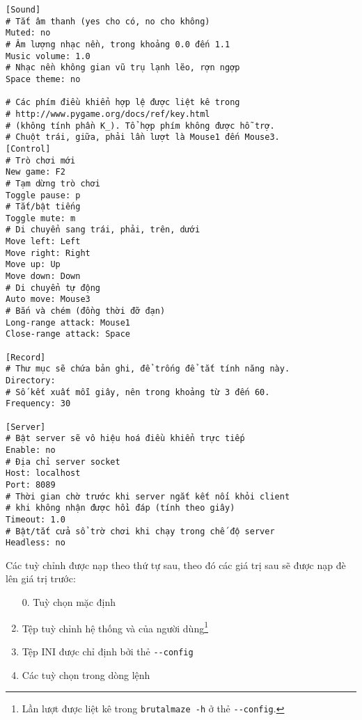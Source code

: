 \documentclass[a4paper,12pt]{article}
\begin{document}
\begin{verbatim}
[Sound]
# Tắt âm thanh (yes cho có, no cho không)
Muted: no
# Âm lượng nhạc nền, trong khoảng 0.0 đến 1.1
Music volume: 1.0
# Nhạc nền không gian vũ trụ lạnh lẽo, rợn ngợp
Space theme: no

# Các phím điều khiển hợp lệ được liệt kê trong
# http://www.pygame.org/docs/ref/key.html
# (không tính phần K_). Tổ hợp phím không được hỗ trợ.
# Chuột trái, giữa, phải lần lượt là Mouse1 đến Mouse3.
[Control]
# Trò chơi mới
New game: F2
# Tạm dừng trò chơi
Toggle pause: p
# Tắt/bật tiếng
Toggle mute: m
# Di chuyển sang trái, phải, trên, dưới
Move left: Left
Move right: Right
Move up: Up
Move down: Down
# Di chuyển tự động
Auto move: Mouse3
# Bắn và chém (đồng thời đỡ đạn)
Long-range attack: Mouse1
Close-range attack: Space

[Record]
# Thư mục sẽ chứa bản ghi, để trống để tắt tính năng này.
Directory:
# Số kết xuất mỗi giây, nên trong khoảng từ 3 đến 60.
Frequency: 30

[Server]
# Bật server sẽ vô hiệu hoá điều khiển trực tiếp
Enable: no
# Địa chỉ server socket
Host: localhost
Port: 8089
# Thời gian chờ trước khi server ngắt kết nối khỏi client
# khi không nhận được hồi đáp (tính theo giây)
Timeout: 1.0
# Bật/tắt cửa sổ trờ chơi khi chạy trong chế độ server
Headless: no
\end{verbatim}

\newpage
Các tuỳ chỉnh được nạp theo thứ tự sau, theo đó các giá trị sau sẽ được nạp đè
lên giá trị trước:
\begin{enumerate}
  \item[0.] Tuỳ chọn mặc định
  \item Tệp tuỳ chỉnh hệ thống và của người dùng\footnote{Lần lượt được liệt kê
    trong \texttt{brutalmaze -h} ở thẻ \texttt{-{}-config}.}
  \item Tệp INI được chỉ định bởi thẻ \verb|--config|
  \item Các tuỳ chọn trong dòng lệnh
\end{enumerate}
\end{document}
